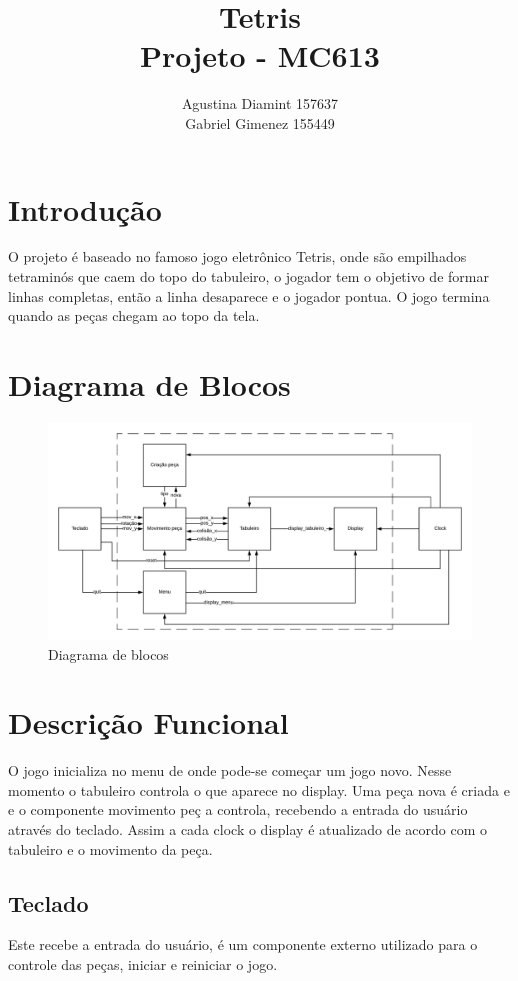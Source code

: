 \documentclass[a4paper,11pt]{article}
\begin{document}
\title{Tetris\\
	Projeto - MC613}
\author{Agustina Diamint 157637\\
 Gabriel Gimenez 155449}
\maketitle
\section{Introdu\c{c}\~ao}
O projeto \'e baseado no famoso jogo eletr\^onico Tetris, onde s\~ao empilhados tetramin\'os que caem do topo do tabuleiro, o jogador tem o objetivo de formar linhas completas, ent\~ao a linha desaparece e o jogador pontua. O jogo termina quando as pe\c{c}as chegam ao topo da tela.

\section{Diagrama de Blocos}
\begin{figure}[!htb]
\centering
\includegraphics[width=\textwidth]{Diagrama_de_blocos}
\caption{Diagrama de blocos}
\end{figure}

\section{Descri\c{c}\~ao Funcional}
O jogo inicializa no menu de onde pode-se come\c{c}ar um jogo novo. Nesse momento o tabuleiro controla o que aparece no display. Uma pe\c{c}a nova \'e criada e e o componente  movimento pe\c{c} a controla, recebendo a entrada do usu\'ario atrav\'es do teclado. Assim a cada clock o display \'e atualizado de acordo com o tabuleiro e o movimento da pe\c{c}a.

\subsection{Teclado}
Este recebe a entrada do usu\'ario, \'e um componente externo utilizado para o controle das pe\c{c}as, iniciar e reiniciar o jogo. 
\end{document}
